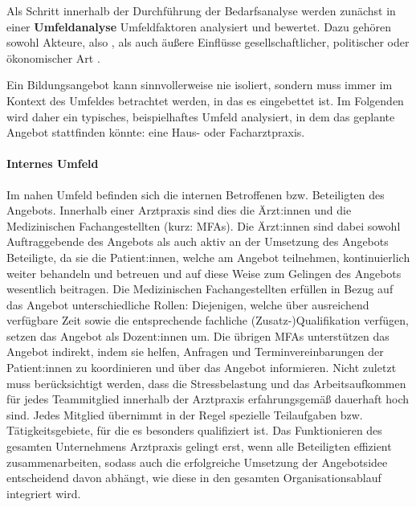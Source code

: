 \documentclass[
  twoside,
  parskip=half-,
]{scrreprt}
\begin{document}
Als Schritt innerhalb der Durchführung der Bedarfsanalyse werden zunächst in einer \textbf{Umfeldanalyse} Umfeldfaktoren analysiert und bewertet. Dazu gehören sowohl Akteure, also , als auch äußere Einflüsse gesellschaftlicher, politischer oder ökonomischer Art \autocite{kos}.

\begin{praxis}
  Ein Bildungsangebot kann sinnvollerweise nie isoliert, sondern muss immer im Kontext des Umfeldes betrachtet werden, in das es eingebettet ist. Im Folgenden wird daher ein typisches, beispielhaftes Umfeld analysiert, in dem das geplante Angebot stattfinden könnte: eine Haus- oder Facharztpraxis.

\paragraph{Internes Umfeld} Im nahen Umfeld befinden sich die internen Betroffenen bzw. Beteiligten des Angebots. Innerhalb einer Arztpraxis sind dies die Ärzt:innen und die Medizinischen Fachangestellten (kurz: MFAs). Die Ärzt:innen sind dabei sowohl Auftraggebende des Angebots als auch aktiv an der Umsetzung des Angebots Beteiligte, da sie die Patient:innen, welche am Angebot teilnehmen, kontinuierlich weiter behandeln und betreuen und auf diese Weise zum Gelingen des Angebots wesentlich beitragen. Die Medizinischen Fachangestellten erfüllen in Bezug auf das Angebot unterschiedliche Rollen: Diejenigen, welche über ausreichend verfügbare Zeit sowie die entsprechende fachliche (Zusatz-)Qualifikation verfügen, setzen das Angebot als Dozent:innen um. Die übrigen MFAs unterstützen das Angebot indirekt, indem sie helfen, Anfragen und Terminvereinbarungen der Patient:innen zu koordinieren und über das Angebot informieren. Nicht zuletzt muss berücksichtigt werden, dass die Stressbelastung und das Arbeitsaufkommen für jedes Teammitglied innerhalb der Arztpraxis erfahrungsgemäß dauerhaft hoch sind. Jedes Mitglied übernimmt in der Regel spezielle Teilaufgaben bzw. Tätigkeitsgebiete, für die es besonders qualifiziert ist. Das Funktionieren des gesamten Unternehmens Arztpraxis gelingt erst, wenn alle Beteiligten effizient zusammenarbeiten, sodass auch die erfolgreiche Umsetzung der Angebotsidee entscheidend davon abhängt, wie diese in den gesamten Organisationsablauf integriert wird.


\end{praxis}
\end{document}
